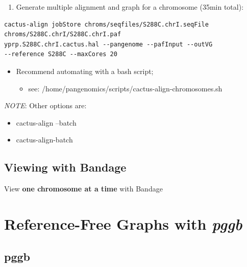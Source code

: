 \documentclass[
]{book}
\providecommand{\tightlist}{%
  \setlength{\itemsep}{0pt}\setlength{\parskip}{0pt}}
\begin{document}
\begin{enumerate}
\def\labelenumi{\arabic{enumi}.}
\setcounter{enumi}{1}
\tightlist
\item
  Generate multiple alignment and graph for a chromosome (35min total):
\end{enumerate}

\begin{verbatim}
cactus-align jobStore chroms/seqfiles/S288C.chrI.seqFile
chroms/S288C.chrI/S288C.chrI.paf
yprp.S288C.chrI.cactus.hal --pangenome --pafInput --outVG
--reference S288C --maxCores 20
\end{verbatim}

\begin{itemize}
\tightlist
\item
  Recommend automating with a bash script;

  \begin{itemize}
  \tightlist
  \item
    see: /home/pangenomics/scripts/cactus-align-chromosomes.sh
  \end{itemize}
\end{itemize}

\emph{NOTE}: Other options are:

\begin{itemize}
\tightlist
\item
  cactus-align --batch
\item
  cactus-align-batch
\end{itemize}

\hypertarget{viewing-with-bandage-1}{%
\section{Viewing with Bandage}\label{viewing-with-bandage-1}}

View \textbf{one chromosome at a time} with Bandage

\hypertarget{reference-free-graphs-with-pggb}{%
\chapter{\texorpdfstring{Reference-Free Graphs with \emph{pggb}}{Reference-Free Graphs with pggb}}\label{reference-free-graphs-with-pggb}}

\hypertarget{pggb}{%
\section{pggb}\label{pggb}}
\end{document}
